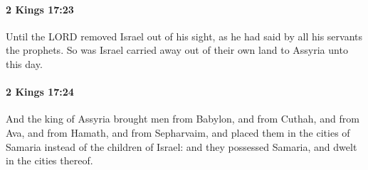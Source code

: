 		\paragraph{2 Kings 17:23} %
			\label{2KINGS-17-23}

			Until the LORD removed Israel out of his sight, as he had said by all his servants the prophets. So was Israel carried away out of their own land to Assyria unto this day.


		\paragraph{2 Kings 17:24} %
			\label{2KINGS-17-24}

			And the king of Assyria brought men from Babylon, and from Cuthah, and from Ava, and from Hamath, and from Sepharvaim, and placed them in the cities of Samaria instead of the children of Israel: and they possessed Samaria, and dwelt in the cities thereof.

